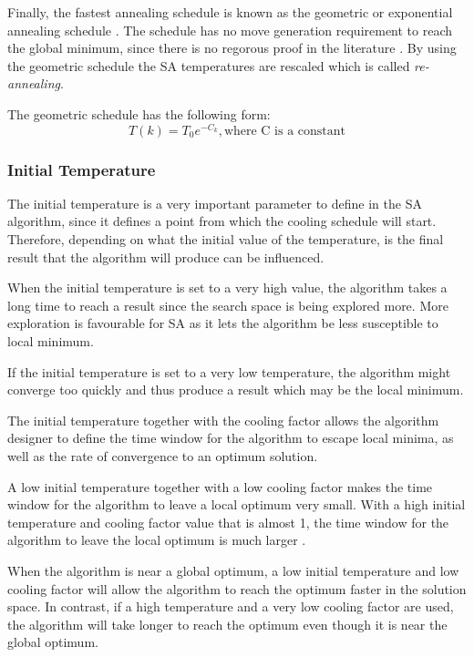 Finally, the fastest annealing schedule is known as the geometric or exponential annealing schedule \cite{SASingleMultiObj}. The schedule has no move generation requirement to reach the global minimum, since there is no regorous proof in the literature \cite{SASingleMultiObj}. By using the geometric schedule the SA temperatures are rescaled which is called \emph{re-annealing}\cite{VeryFastSAImageEnchancement}.

The geometric schedule has the following form:
\begin{equation}
\label{eq:geocooling}
	T(k)=T_0e^{-C_k},\text{where C is a constant}
\end{equation}

\subsubsection{Initial Temperature}
The initial temperature is a very important parameter to define in the SA algorithm, since it defines a point from which the cooling schedule will start\cite{VariousCoolingSA}. Therefore, depending on what the initial value of the temperature, is the final result that the algorithm will produce can be influenced\cite{SALongestCommon,AutoConfigSA}.

When the initial temperature is set to a very high value, the algorithm takes a long time to reach a result since the search space is being explored more\cite{SALongestCommon,VariousCoolingSA}. More exploration is favourable for SA as it lets the algorithm be less susceptible to local minimum. 

If the initial temperature is set to a very low temperature, the algorithm might converge too quickly and thus produce a result which may be the local minimum\cite{SALongestCommon,VariousCoolingSA,AutoConfigSA}.

The initial temperature together with the cooling factor allows the algorithm designer to define the time window for the algorithm to escape local minima, as well as the rate of convergence to an optimum solution\cite{SALongestCommon,VariousCoolingSA}.

A low initial temperature together with a low cooling factor makes the time window for the algorithm to leave a local optimum very small\cite{SALongestCommon}. With a high initial temperature and cooling factor value that is almost 1, the time window for the algorithm to leave the local optimum is much larger \cite{SALongestCommon}. 

When the algorithm is near a global optimum, a low initial temperature and low cooling factor will allow the algorithm to reach the optimum faster in the solution space\cite{SALongestCommon}. In contrast, if a high temperature and a very low cooling factor are used, the algorithm will take longer to reach the optimum even though it is near the global optimum\cite{SALongestCommon}.


